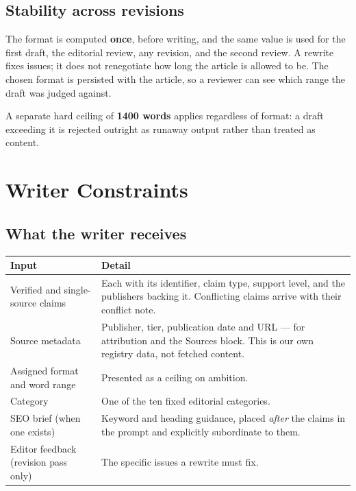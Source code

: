 \documentclass[11pt,a4paper]{article}
\begin{document}
\subsection{Stability across revisions}

The format is computed \textbf{once}, before writing, and the same value is used
for the first draft, the editorial review, any revision, and the second review. A
rewrite fixes issues; it does not renegotiate how long the article is allowed to
be. The chosen format is persisted with the article, so a reviewer can see which
range the draft was judged against.

A separate hard ceiling of \textbf{1400 words} applies regardless of format: a
draft exceeding it is rejected outright as runaway output rather than treated as
content.

\section{Writer Constraints}

\subsection{What the writer receives}

\begin{center}
\small
\begin{tabularx}{\textwidth}{@{}p{4.6cm} >{\RaggedRight}X@{}}
\toprule
\textbf{Input} & \textbf{Detail} \\
\midrule
Verified and single-source claims & Each with its identifier, claim type, support
  level, and the publishers backing it. Conflicting claims arrive with their
  conflict note. \\
Source metadata & Publisher, tier, publication date and URL --- for attribution
  and the Sources block. This is our own registry data, not fetched content. \\
Assigned format and word range & Presented as a ceiling on ambition. \\
Category & One of the ten fixed editorial categories. \\
SEO brief (when one exists) & Keyword and heading guidance, placed \emph{after}
  the claims in the prompt and explicitly subordinate to them. \\
Editor feedback (revision pass only) & The specific issues a rewrite must fix. \\
\bottomrule
\end{tabularx}
\end{center}
\end{document}
